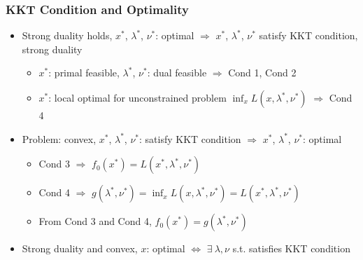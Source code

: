 \subsubsection*{KKT Condition and Optimality}
\begin{itemize}
    \item Strong duality holds, $x^\ast$, $\lambda^\ast$, $\nu^\ast$: optimal $\Rightarrow$ $x^\ast$, $\lambda^\ast$, $\nu^\ast$ satisfy KKT condition, strong duality
    \begin{itemize}
        \item $x^\ast$: primal feasible, $\lambda^\ast$, $\nu^\ast$: dual feasible $\Rightarrow$ Cond 1, Cond 2
        \item $x^\ast$: local optimal for unconstrained problem $\inf_x L(x,\lambda^\ast,\nu^\ast)$ $\Rightarrow$ Cond 4
    \end{itemize}
    \item Problem: convex, $x^\ast$, $\lambda^\ast$, $\nu^\ast$: satisfy KKT condition $\Rightarrow$ $x^\ast$, $\lambda^\ast$, $\nu^\ast$: optimal
    \begin{itemize}
        \item Cond 3 $\Rightarrow$ $f_0(x^\ast)=L(x^\ast,\lambda^\ast,\nu^\ast)$
        \item Cond 4 $\Rightarrow$ $g(\lambda^\ast,\nu^\ast)=\inf_{x}L(x,\lambda^\ast,\nu^\ast)=L(x^\ast,\lambda^\ast,\nu^\ast)$
        \item From Cond 3 and Cond 4, $f_0(x^\ast) = g(\lambda^\ast,\nu^\ast)$
    \end{itemize}
    \item Strong duality and convex, $x$: optimal $\Leftrightarrow$ $\exists~\lambda,\nu$ s.t. satisfies KKT condition
\end{itemize}

